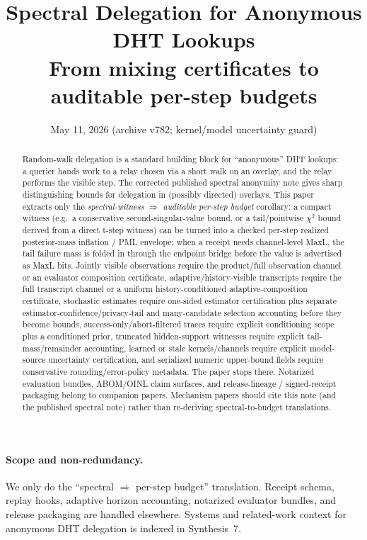 \documentclass[11pt]{article}
\title{Spectral Delegation for Anonymous DHT Lookups\\
\large From mixing certificates to auditable per-step budgets}
\author{}
\date{May 11, 2026 (archive v782; kernel/model uncertainty guard)}
\begin{document}
\maketitle

\begin{abstract}
Random-walk delegation is a standard building block for ``anonymous'' DHT lookups:
a querier hands work to a relay chosen via a short walk on an overlay, and the relay performs the visible step.
The corrected published spectral anonymity note gives sharp distinguishing bounds for delegation in (possibly directed) overlays.
This paper extracts only the \emph{spectral-witness $\Rightarrow$ auditable per-step budget} corollary: a compact witness (e.g.\ a conservative second-singular-value bound, or a tail/pointwise $\chi^2$ bound derived from a direct t-step witness)
can be turned into a checked per-step realized posterior-mass inflation / PML envelope; when a receipt needs channel-level MaxL, the tail failure mass is folded in through the endpoint bridge before the value is advertised as MaxL bits. Jointly visible observations require the product/full observation channel or an evaluator composition certificate, adaptive/history-visible transcripts require the full transcript channel or a uniform history-conditioned adaptive-composition certificate, stochastic estimates require one-sided estimator certification plus separate estimator-confidence/privacy-tail and many-candidate selection accounting before they become bounds, success-only/abort-filtered traces require explicit conditioning scope plus a conditioned prior, truncated hidden-support witnesses require explicit tail-mass/remainder accounting, learned or stale kernels/channels require explicit model-source uncertainty certification, and serialized numeric upper-bound fields require conservative rounding/error-policy metadata.\cite{series:endpointbridge}
The paper stops there.  Notarized evaluation bundles, ABOM/OINL claim surfaces, and release-lineage / signed-receipt packaging belong to companion papers.\cite{series:notcert,series:abomoinl,series:releaseA}
Mechanism papers should cite this note (and the published spectral note) rather than re-deriving spectral-to-budget translations.
\end{abstract}

\paragraph{Scope and non-redundancy.}
We only do the ``spectral $\Rightarrow$ per-step budget'' translation.
Receipt schema, replay hooks, adaptive horizon accounting, notarized evaluator bundles, and release packaging are handled elsewhere.\cite{series:receiptitems,series:condcert,series:accountingrulebook,series:notcert,series:abomoinl,series:releaseA}
Systems and related-work context for anonymous DHT delegation is indexed in Synthesis~7.\cite{series:relatedworkmap}
\end{document}
